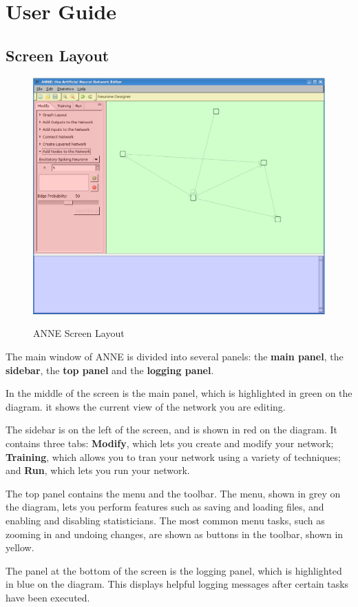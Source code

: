 \documentclass[11pt]{report}
\begin{document}
\tableofcontents
\newpage
\section{User Guide}
\subsection{Screen Layout}
{
\begin{figure}[t]
\centering
\scalebox{0.4} {
	\includegraphics{layout}
}
\caption{ANNE Screen Layout}
\label{fig:layout}
\end{figure}
The main window of ANNE is divided into several panels: the {\textbf{main panel}}, the {\textbf{sidebar}}, the {\textbf{top panel}} and the {\textbf{logging panel}}.

\noindent
In the middle of the screen is the main panel, which is highlighted in green on the diagram. it shows the current view of the network you are editing.

\noindent
The sidebar is on the left of the screen, and is shown in red on the diagram. It contains three tabs: {\textbf{Modify}}, which lets you create and modify your network; {\textbf{Training}}, which allows you to tran your network using a variety of techniques; and {\textbf{Run}}, which lets you run your network.

\noindent
The top panel contains the menu and the toolbar. The menu, shown in grey on the diagram, lets you perform features such as saving and loading files, and enabling and disabling statisticians. The most common menu tasks, such as zooming in and undoing changes, are shown as buttons in the toolbar, shown in yellow.

\noindent
The panel at the bottom of the screen is the logging panel, which is highlighted in blue on the diagram. This displays helpful logging messages after certain tasks have been executed.
}
\newpage
\end{document}
